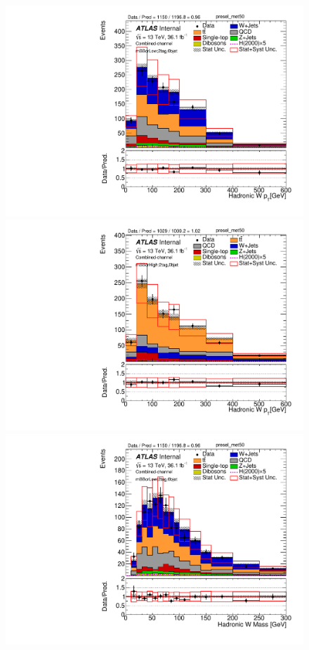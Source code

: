 \begin{figure}[!h]
\begin{center}
\includegraphics[scale=0.33]{./figures/boosted/PlotByMbbRegions/DataMC_2tag_0bjet_mbbcrLow_lepton_presel_met50_WhadPt}                                                                              
\includegraphics[scale=0.33]{./figures/boosted/PlotByMbbRegions/DataMC_2tag_0bjet_mbbcrHigh_lepton_presel_met50_WhadPt}                                                                             
\includegraphics[scale=0.33]{./figures/boosted/PlotByMbbRegions/DataMC_2tag_0bjet_mbbcrLow_lepton_presel_met50_WhadMass}                                                                            

\end{center}
\end{figure}
